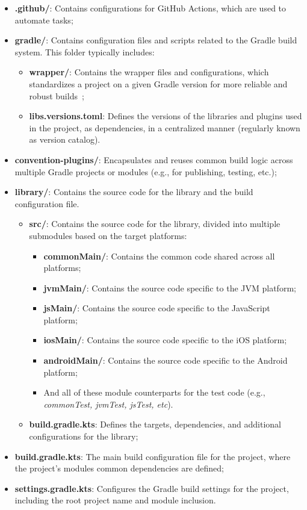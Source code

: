 \begin{itemize}
    \item \textbf{.github/}: Contains configurations for GitHub Actions, which are used to automate tasks;
    \item \textbf{gradle/}: Contains configuration files and scripts related to the Gradle build system.
    This folder typically includes:
    \begin{itemize}
        \item \textbf{wrapper/}: Contains the wrapper files and configurations, which standardizes a project on a given Gradle version for more reliable and robust builds~\cite{gradle-wrapper};
        \item \textbf{libs.versions.toml}: Defines the versions of the libraries and plugins used in the project, as dependencies, in a centralized manner (regularly known as version catalog).
    \end{itemize}
    \item \textbf{convention-plugins/}: Encapsulates and reuses common build logic across multiple Gradle projects or modules (e.g., for publishing, testing, etc.);
    \item \textbf{library/}: Contains the source code for the library and the build configuration file.
    \begin{itemize}
        \item \textbf{src/}: Contains the source code for the library, divided into multiple submodules based on the target platforms:
        \begin{itemize}
            \item \textbf{commonMain/}: Contains the common code shared across all platforms;
            \item \textbf{jvmMain/}: Contains the source code specific to the JVM platform;
            \item \textbf{jsMain/}: Contains the source code specific to the JavaScript platform;
            \item \textbf{iosMain/}: Contains the source code specific to the iOS platform;
            \item \textbf{androidMain/}: Contains the source code specific to the Android platform;
            \item And all of these module counterparts for the test code (e.g., \textit{commonTest, jvmTest, jsTest, etc}).
        \end{itemize}
        \item \textbf{build.gradle.kts}: Defines the targets, dependencies, and additional configurations for the library;
    \end{itemize}
    \item \textbf{build.gradle.kts}: The main build configuration file for the project, where the project's modules common dependencies are defined;
    \item \textbf{settings.gradle.kts}: Configures the Gradle build settings for the project, including the root project name and module inclusion.
\end{itemize}

